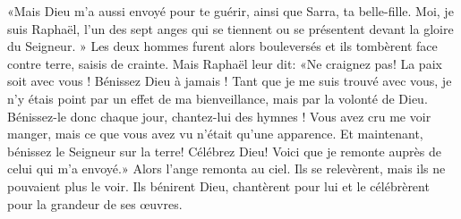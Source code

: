 «Mais Dieu m’a aussi envoyé pour te guérir, ainsi que Sarra, ta belle-fille.
Moi, je suis Raphaël,
	l’un des sept anges qui se tiennent ou se présentent
		devant la gloire du Seigneur. »
Les deux hommes furent alors bouleversés
	et ils tombèrent face contre terre, saisis de crainte.
Mais Raphaël leur dit: «Ne craignez pas!
	La paix soit avec vous ! Bénissez Dieu à jamais !
Tant que je me suis trouvé avec vous,
	je n’y étais point par un effet de ma bienveillance,
	mais par la volonté de Dieu.
Bénissez-le donc chaque jour, chantez-lui des hymnes !
Vous avez cru me voir manger,
	mais ce que vous avez vu n’était qu’une apparence.
Et maintenant, bénissez le Seigneur sur la terre! Célébrez Dieu!
	Voici que je remonte auprès de celui qui m’a envoyé.»
Alors l’ange remonta au ciel.
Ils se relevèrent, mais ils ne pouvaient plus le voir.
Ils bénirent Dieu, chantèrent pour lui
	et le célébrèrent pour la grandeur de ses œuvres.
